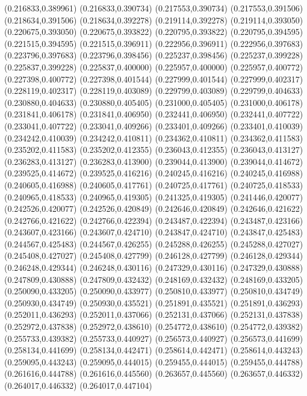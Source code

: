 (0.216833,0.389961)
(0.216833,0.390734)
(0.217553,0.390734)
(0.217553,0.391506)
(0.218634,0.391506)
(0.218634,0.392278)
(0.219114,0.392278)
(0.219114,0.393050)
(0.220675,0.393050)
(0.220675,0.393822)
(0.220795,0.393822)
(0.220795,0.394595)
(0.221515,0.394595)
(0.221515,0.396911)
(0.222956,0.396911)
(0.222956,0.397683)
(0.223796,0.397683)
(0.223796,0.398456)
(0.225237,0.398456)
(0.225237,0.399228)
(0.225837,0.399228)
(0.225837,0.400000)
(0.225957,0.400000)
(0.225957,0.400772)
(0.227398,0.400772)
(0.227398,0.401544)
(0.227999,0.401544)
(0.227999,0.402317)
(0.228119,0.402317)
(0.228119,0.403089)
(0.229799,0.403089)
(0.229799,0.404633)
(0.230880,0.404633)
(0.230880,0.405405)
(0.231000,0.405405)
(0.231000,0.406178)
(0.231841,0.406178)
(0.231841,0.406950)
(0.232441,0.406950)
(0.232441,0.407722)
(0.233041,0.407722)
(0.233041,0.409266)
(0.233401,0.409266)
(0.233401,0.410039)
(0.234242,0.410039)
(0.234242,0.410811)
(0.234362,0.410811)
(0.234362,0.411583)
(0.235202,0.411583)
(0.235202,0.412355)
(0.236043,0.412355)
(0.236043,0.413127)
(0.236283,0.413127)
(0.236283,0.413900)
(0.239044,0.413900)
(0.239044,0.414672)
(0.239525,0.414672)
(0.239525,0.416216)
(0.240245,0.416216)
(0.240245,0.416988)
(0.240605,0.416988)
(0.240605,0.417761)
(0.240725,0.417761)
(0.240725,0.418533)
(0.240965,0.418533)
(0.240965,0.419305)
(0.241325,0.419305)
(0.241446,0.420077)
(0.242526,0.420077)
(0.242526,0.420849)
(0.242646,0.420849)
(0.242646,0.421622)
(0.242766,0.421622)
(0.242766,0.422394)
(0.243487,0.422394)
(0.243487,0.423166)
(0.243607,0.423166)
(0.243607,0.424710)
(0.243847,0.424710)
(0.243847,0.425483)
(0.244567,0.425483)
(0.244567,0.426255)
(0.245288,0.426255)
(0.245288,0.427027)
(0.245408,0.427027)
(0.245408,0.427799)
(0.246128,0.427799)
(0.246128,0.429344)
(0.246248,0.429344)
(0.246248,0.430116)
(0.247329,0.430116)
(0.247329,0.430888)
(0.247809,0.430888)
(0.247809,0.432432)
(0.248169,0.432432)
(0.248169,0.433205)
(0.250090,0.433205)
(0.250090,0.433977)
(0.250810,0.433977)
(0.250810,0.434749)
(0.250930,0.434749)
(0.250930,0.435521)
(0.251891,0.435521)
(0.251891,0.436293)
(0.252011,0.436293)
(0.252011,0.437066)
(0.252131,0.437066)
(0.252131,0.437838)
(0.252972,0.437838)
(0.252972,0.438610)
(0.254772,0.438610)
(0.254772,0.439382)
(0.255733,0.439382)
(0.255733,0.440927)
(0.256573,0.440927)
(0.256573,0.441699)
(0.258134,0.441699)
(0.258134,0.442471)
(0.258614,0.442471)
(0.258614,0.443243)
(0.259095,0.443243)
(0.259095,0.444015)
(0.259455,0.444015)
(0.259455,0.444788)
(0.261616,0.444788)
(0.261616,0.445560)
(0.263657,0.445560)
(0.263657,0.446332)
(0.264017,0.446332)
(0.264017,0.447104)
